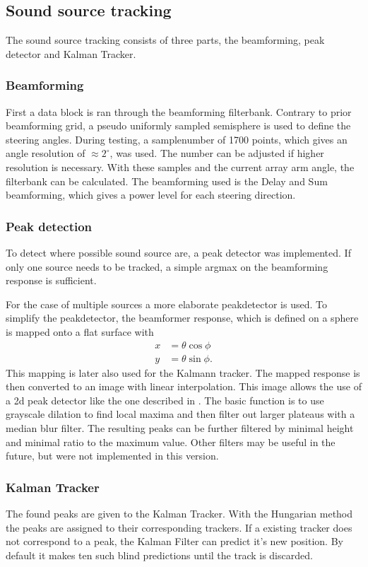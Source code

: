 \subsection{Sound source tracking}
The sound source tracking consists of three parts, the beamforming, peak detector and 
Kalman Tracker.

\subsubsection*{Beamforming}
First a data block is ran through the beamforming filterbank.
Contrary to prior beamforming grid, a pseudo uniformly sampled 
semisphere is used to define the steering angles.
During testing, a samplenumber of 1700 points, which 
gives an angle resolution of $\approx 2^\circ$, was used.
The number can be adjusted if higher resolution is necessary.
With these samples and the current array arm angle, the filterbank can be
calculated.
The beamforming used is the Delay and Sum beamforming, 
which gives a power level for each steering direction.

\subsubsection*{Peak detection}
To detect where possible sound source are, a peak detector was implemented.
If only one source needs to be tracked, a simple argmax on the beamforming 
response is sufficient.

For the case of multiple sources a more elaborate peakdetector is used.
To simplify the peakdetector, the beamformer response, which is defined on
a sphere is mapped onto a flat surface with
\begin{align}
	x &= \theta \cos\phi \\
	y &= \theta \sin\phi.
	\label{eq:maping}
\end{align}
This mapping is later also used for the Kalmann tracker.
The mapped response is then converted to an image with linear interpolation.
This image allows the use of a 2d peak detector like the one described in 
\cite{cvpeakdet}.
The basic function is to use grayscale dilation to find local maxima
and then filter out larger plateaus with a 
median blur filter.
The resulting peaks can be further filtered by minimal height and 
minimal ratio to the maximum value.
Other filters may be useful in the future, but were not implemented in this version.

\subsubsection*{Kalman Tracker}
The found peaks are given to the Kalman Tracker.
With the Hungarian method the peaks are assigned to their corresponding
trackers. 
If a existing tracker does not correspond to a peak, the Kalman
Filter can predict it's new position. 
By default it makes ten such blind predictions until the track is discarded.

